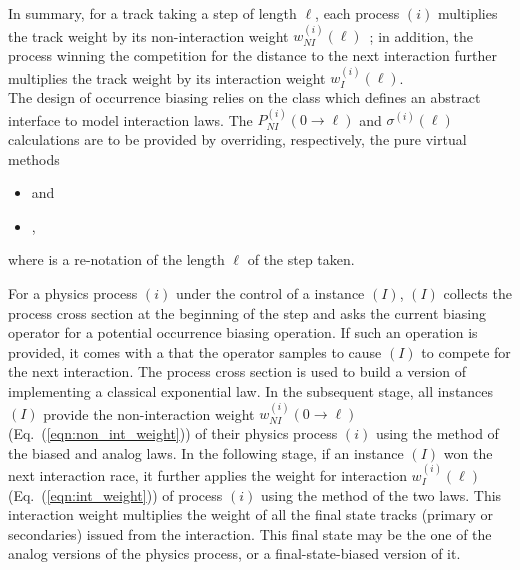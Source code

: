 In summary, for a track taking a step of length $\ell$, each process $(i)$
multiplies the track weight by its non-interaction weight $w_{NI}^{(i)}(\ell)$~\cite{bib:Weller};
in addition, the process winning the competition for the distance to the next
interaction further multiplies the track weight by its interaction weight 
$w_{I}^{(i)}(\ell)$.\\

The design of occurrence biasing relies on the 
 class
which defines an abstract interface to model interaction laws.
The $P^{(i)}_{NI}(0\to\ell)$ and $\sigma^{(i)}(\ell)$ calculations are to be
provided by overriding, respectively, the pure virtual methods
\begin{itemize}
\item {} and
\item {},
\end{itemize}
where  is a re-notation of the length $\ell$ of the step taken.

For a physics process $(i)$ under the control of a 
instance $(I)$, $(I)$ collects the process cross section at the beginning of
the step and asks the current biasing operator for a potential occurrence 
biasing operation.  If such an operation is provided, it comes with a 
 that the operator
samples to cause $(I)$ to compete for the next interaction.  The process cross
section is used to build a version of 
 implementing a 
classical exponential law.  In the subsequent 
stage, all instances $(I)$ provide the non-interaction weight
$w_{NI}^{(i)}(0\to\ell)$ (Eq.~(\ref{eqn:non_int_weight})) of their physics process $(i)$
using the method 
of the biased and analog laws.  In the following 
stage, if an instance $(I)$ won the next interaction race, it further applies the weight
for interaction
$w_{I}^{(i)}(\ell)$ (Eq.~(\ref{eqn:int_weight})) of process $(i)$
using the
method of the two laws.  This interaction weight multiplies the weight of all 
the final state tracks
(primary or secondaries) issued from the interaction. This final state may
be the one of the analog versions of the physics process, or a final-state-biased
version of it.\\

